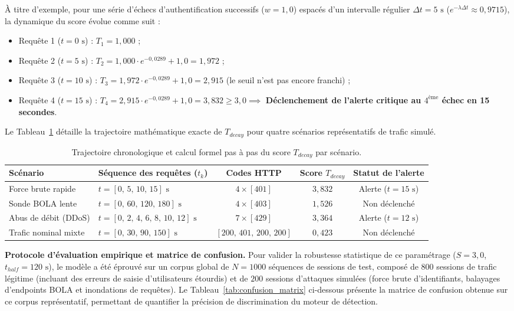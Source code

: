 À titre d'exemple, pour une série d'échecs d'authentification successifs ($w = 1{,}0$) espacés d'un intervalle régulier $\Delta t = 5\text{ s}$ ($e^{-\lambda \Delta t} \approx 0{,}9715$), la dynamique du score évolue comme suit :
\begin{itemize}[leftmargin=*]
    \item Requête 1 ($t = 0\text{ s}$) : $T_1 = 1{,}000$ ;
    \item Requête 2 ($t = 5\text{ s}$) : $T_2 = 1{,}000 \cdot e^{-0{,}0289} + 1{,}0 = 1{,}972$ ;
    \item Requête 3 ($t = 10\text{ s}$) : $T_3 = 1{,}972 \cdot e^{-0{,}0289} + 1{,}0 = 2{,}915$ (le seuil n'est pas encore franchi) ;
    \item Requête 4 ($t = 15\text{ s}$) : $T_4 = 2{,}915 \cdot e^{-0{,}0289} + 1{,}0 = 3{,}832 \ge 3{,}0 \implies$ \textbf{Déclenchement de l'alerte critique au $4^{\text{ème}}$ échec en 15 secondes}.
\end{itemize}

Le Tableau~\ref{tab:score_chronology} détaille la trajectoire mathématique exacte de $T_{decay}$ pour quatre scénarios représentatifs de trafic simulé.

\begin{table}[!htbp]
\centering
\footnotesize
\begin{tabular}{@{}lp{4.5cm}ccc@{}}
\toprule
\textbf{Scénario} & \textbf{Séquence des requêtes ($t_k$)} & \textbf{Codes HTTP} & \textbf{Score $T_{decay}$} & \textbf{Statut de l'alerte} \\
\midrule
Force brute rapide & $t = [0,\, 5,\, 10,\, 15]\text{ s}$ & $4 \times [401]$ & $3{,}832$ & Alerte ($t = 15\text{ s}$) \\
Sonde BOLA lente & $t = [0,\, 60,\, 120,\, 180]\text{ s}$ & $4 \times [403]$ & $1{,}526$ & Non déclenché \\
Abus de débit (DDoS) & $t = [0,\, 2,\, 4,\, 6,\, 8,\, 10,\, 12]\text{ s}$ & $7 \times [429]$ & $3{,}364$ & Alerte ($t = 12\text{ s}$) \\
Trafic nominal mixte & $t = [0,\, 30,\, 90,\, 150]\text{ s}$ & $[200,\, 401,\, 200,\, 200]$ & $0{,}423$ & Non déclenché \\
\bottomrule
\end{tabular}
\caption{Trajectoire chronologique et calcul formel pas à pas du score $T_{decay}$ par scénario.}
\label{tab:score_chronology}
\end{table}

\textbf{Protocole d'évaluation empirique et matrice de confusion.} Pour valider la robustesse statistique de ce paramétrage ($S = 3{,}0$, $t_{half} = 120\text{ s}$), le modèle a été éprouvé sur un corpus global de $N = 1000$ séquences de sessions de test, composé de $800$ sessions de trafic légitime (incluant des erreurs de saisie d'utilisateurs étourdis) et de $200$ sessions d'attaques simulées (force brute d'identifiants, balayages d'endpoints BOLA et inondations de requêtes). Le Tableau~\ref{tab:confusion_matrix} ci-dessous présente la matrice de confusion obtenue sur ce corpus représentatif, permettant de quantifier la précision de discrimination du moteur de détection.

